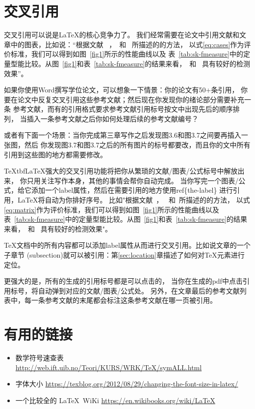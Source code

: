 \documentclass[UTF8]{ctexart}
\numberwithin{equation}{section} %
\numberwithin{table}{section} %
\begin{document}
\section{交叉引用}\label{sec:ref}
交叉引用可以说是\LaTeX 的核心竞争力了。
我们经常需要在论文中引用文献和文章中的图表，比如说：“根据文献
~\cite{shen2017label}，~\cite{shen2016object}和~\cite{shen2017deepskeleton}
所描述的的方法，
以式\ref{eq:cases}作为评价标准，我们可以得到如图~\ref{fig1}所示的性能曲线以及
表~\ref{tab:sk-fmeasure}中的定量型能比较。从图~\ref{fig1}和表~\ref{tab:sk-fmeasure}的结果来看，~\cite{shen2016object}和~\cite{shen2017deepskeleton}
具有较好的检测效果”。

如果你使用Word撰写学位论文，可以想象一下情景：你的论文有50+条引用，
你要在论文中反复交叉引用这些参考文献；然后现在你发现你的绪论部分需要补充一条
参考文献，而有的引用格式要求参考文献引用标号按文中出现先后的顺序排列，
当插入一条参考文献之后你如何处理后续的参考文献编号？


或者有下面一个场景：当你完成第三章写作之后发现图3.6和图3.7之间要再插入一张图，然后
你发现图3.7和图3.7之后的所有图片的标号都要改，而且你的文中所有引用到这些图的地方都需要修改。

\TeX tbf{\LaTeX 强大的交叉引用功能}将把你从繁琐的文献/图表/公式标号中解放出来，
你只用关注写作本身，其他的事情会帮你自动完成。
%
当你写完一个图表/公式，给它添加一个label属性，然后在需要引用的地方使用ref\{the-label\}
进行引用，\LaTeX 将自动为你排好序号。
%
比如"根据文献~\cite{shen2017label}，~\cite{shen2016object}
和~\cite{shen2017deepskeleton}所描述的的方法，
以式\ref{eq:matrix}作为评价标准，我们可以得到如图~\ref{fig1}所示的性能曲线以及
表~\ref{tab:sk-fmeasure}中的定量型能比较。从图~\ref{fig1}和表~\ref{tab:sk-fmeasure}的结果来看，~\cite{shen2016object}和~\cite{shen2017deepskeleton}
具有较好的检测效果"。

\TeX 文档中的所有内容都可以添加label属性从而进行交叉引用。比如说文章的一个子章节
(subsection)就可以被引用：第\ref{sec:location}章描述了如何对\TeX 元素进行定位。

更强大的是，所有的生成的引用标号都是可以点击的，
当你在生成的pdf中点击引用标号，将自动弹到对应的文献/图表/公式处。
%
另外，在文章最后的参考文献列表中，每一条参考文献的末尾都会标注这条参考文献在哪一页被引用。

%


\section{有用的链接}
\begin{itemize}
  \item 数学符号速查表 \url{http://web.ift.uib.no/Teori/KURS/WRK/TeX/symALL.html}
  \item 字体大小 \url{https://texblog.org/2012/08/29/changing-the-font-size-in-latex/}
  \item 一个比较全的 \LaTeX  \ WiKi \url{https://en.wikibooks.org/wiki/LaTeX}
\end{itemize}
\end{document}
